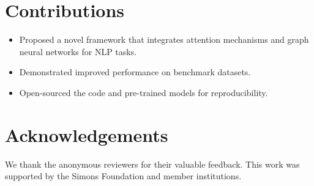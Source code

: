 \documentclass{article}
\begin{document}
\section{Contributions}
\begin{itemize}
    \item Proposed a novel framework that integrates attention mechanisms and graph neural networks for NLP tasks.
    \item Demonstrated improved performance on benchmark datasets.
    \item Open-sourced the code and pre-trained models for reproducibility.
\end{itemize}

\section*{Acknowledgements}
We thank the anonymous reviewers for their valuable feedback. This work was supported by the Simons Foundation and member institutions.



\end{document}
